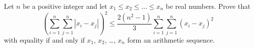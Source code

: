 Let $n$ be a positive integer and
let $x_1 \le x_2 \le \dots \le x_n$ be real numbers.
Prove that
\[ \left(\sum_{i=1}^{n}\sum_{j=1}^{n} |x_i - x_j|\right)^2
  \le \frac{2(n^2-1)}{3}\sum_{i=1}^{n}\sum_{j=1}^{n} (x_i - x_j)^2 \]
with equality if and only if $x_1$, $x_2$, \dots, $x_n$
form an arithmetic sequence.